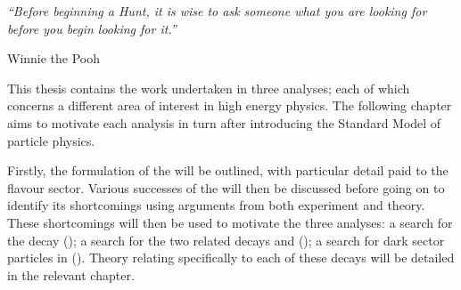 
\begin{minipage}{\textwidth}
  {\it ``Before beginning a Hunt, it is wise to ask someone what you are looking for before you
  begin looking for it.''}

  {\hfill Winnie the Pooh}
\end{minipage}

\vspace{2em}

This thesis contains the work undertaken in three analyses; each of which concerns a different area
of interest in high energy physics.
The following chapter aims to motivate each analysis in turn after introducing the Standard Model
of particle physics.

Firstly, the formulation of the \sm will be outlined, with particular detail paid to the flavour
sector.
Various successes of the \sm will then be discussed before going on to identify its shortcomings
using arguments from both experiment and theory.
These shortcomings will then be used to motivate the three analyses:
a search for the decay \btodsphi ();
a search for the two related decays \btokpipimumu and \btophikmumu ();
a search for dark sector particles in \btokstmumu ().
Theory relating specifically to each of these decays will be detailed in the relevant chapter.


